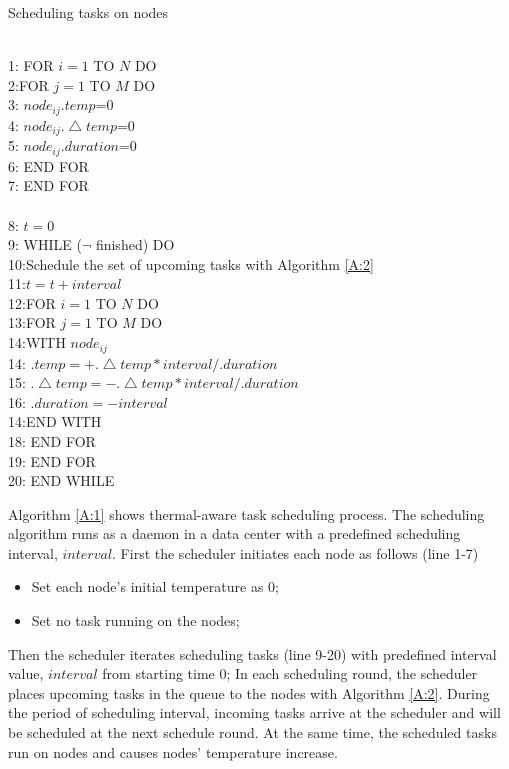 \begin{algorithm}
\caption{Scheduling tasks on nodes}
\label{A:1}
~\\
1:    FOR $i =1$  TO  $N$ DO\\
2:\BH FOR $j =1$  TO  $M$ DO\\
3: \BH\BH   $node_{ij}.temp$=0\\
4: \BH\BH   $node_{ij}.\bigtriangleup{temp}$=0\\
5: \BH\BH   $node_{ij}. duration $=0\\
6:  \BH END FOR\\
7:  END FOR\\
\\ 
8:       $t=0$\\
9:       WHILE ($\lnot$ finished) DO\\
10:\BH     Schedule the set of upcoming tasks with Algorithm \ref{A:2}\\
11:\BH     $t=t+interval$\\
12:\BH      FOR $i =1$  TO  $N$ DO\\
13:\BH \BH FOR $j =1$  TO  $M$ DO\\
14:\BH\BH\BH    WITH $node_{ij}$\\
14: \BH\BH\BH   $.temp=+.\bigtriangleup{temp}* interval/. duration $\\
15: \BH\BH\BH   $.\bigtriangleup{temp}=-.\bigtriangleup{temp}* interval/.duration$\\
16: \BH\BH  \BH $.duration=-interval $\\
14:\BH\BH\BH  END WITH\\
18:  \BH\BH END FOR\\
19:  \BH END FOR\\
20:			 END WHILE\\
\end{algorithm}
Algorithm \ref{A:1} shows thermal-aware task scheduling process. The scheduling algorithm runs as a daemon in a data center with a predefined scheduling interval, $interval$. First the scheduler initiates each node as follows (line 1-7)
\begin{itemize}
\item Set each node's initial temperature as 0;
\item Set no task running on the nodes;
\end{itemize}
Then the scheduler iterates scheduling tasks (line 9-20) with predefined interval value, $interval$ from starting time 0; In each scheduling round, the scheduler places upcoming tasks in the queue to the nodes with Algorithm \ref{A:2}. During the period of scheduling interval, incoming tasks arrive at the scheduler and will be scheduled at the next schedule round. At the same time, the scheduled tasks run on nodes and causes nodes' temperature increase. 
 

